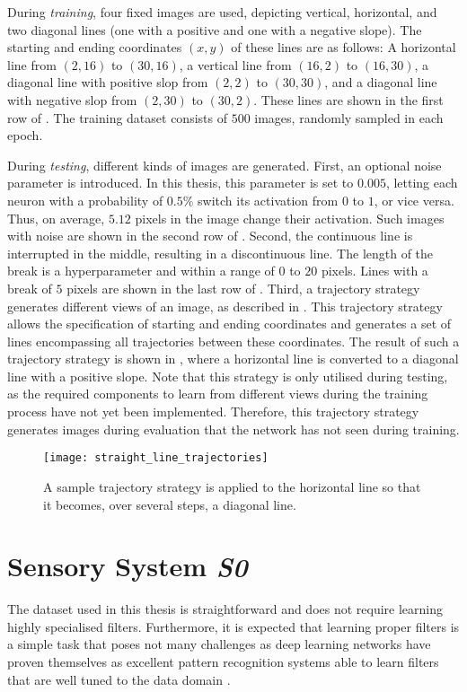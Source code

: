 During \emph{training}, four fixed images are used, depicting vertical, horizontal, and two diagonal lines (one with a positive and one with a negative slope). The starting and ending coordinates $(x, y)$ of these lines are as follows: A horizontal line from $(2, 16)$ to $(30, 16)$, a vertical line from $(16, 2)$ to $(16, 30)$, a diagonal line with positive slop from $(2, 2)$ to $(30, 30)$, and a diagonal line with negative slop from $(2, 30)$ to $(30, 2)$. These lines are shown in the first row of .
The training dataset consists of $500$ images, randomly sampled in each epoch.

During \emph{testing}, different kinds of images are generated. 
First, an optional noise parameter is introduced. In this thesis, this parameter is set to $0.005$, letting each neuron with a probability of $0.5\%$ switch its activation from $0$ to $1$, or vice versa. Thus, on average, $5.12$ pixels in the image change their activation. Such images with noise are shown in the second row of .
Second, the continuous line is interrupted in the middle, resulting in a discontinuous line. The length of the break is a hyperparameter and within a range of $0$ to $20$ pixels. Lines with a break of $5$ pixels are shown in the last row of .
Third, a trajectory strategy generates different views of an image, as described in . This trajectory strategy allows the specification of starting and ending coordinates and generates a set of lines encompassing all trajectories between these coordinates.
The result of such a trajectory strategy is shown in , where a horizontal line is converted to a diagonal line with a positive slope. Note that this strategy is only utilised during testing, as the required components to learn from different views during the training process have not yet been implemented. Therefore, this trajectory strategy generates images during evaluation that the network has not seen during training. 

\begin{figure}[h]
    \centering
    \texttt{[image: straight\_line\_trajectories]}
    \caption[Sample line trajectory strategy]{A sample trajectory strategy is applied to the horizontal line so that it becomes, over several steps, a diagonal line.}
\end{figure}


\section{Sensory System \emph{S0}}
The dataset used in this thesis is straightforward and does not require learning highly specialised filters.
Furthermore, it is expected that learning proper filters is a simple task that poses not many challenges as deep learning networks have proven themselves as excellent pattern recognition systems able to learn filters that are well tuned to the data domain .

